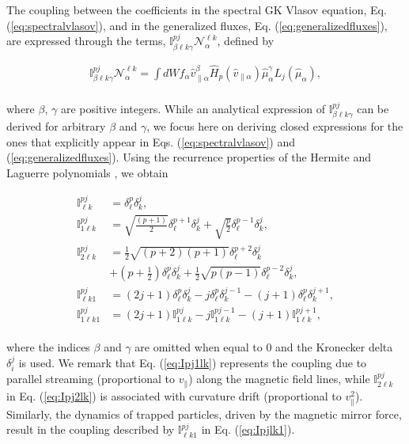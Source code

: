 \documentclass[preprint,12pt]{elsarticle}
\begin{document}
The coupling between the coefficients in the spectral GK Vlasov equation, Eq. (\ref{eq:spectralvlasov}), and in the generalized fluxes, Eq. (\ref{eq:generalizedfluxes}), are expressed through the terms, $\mathbb{I}^{ pj }_{\beta\ell k \gamma} \mathcal{N}_\alpha^{\ell k}$, defined by

\begin{align}
 \mathbb{I}^{ pj }_{\beta\ell k \gamma} \mathcal{N}_\alpha^{\ell k} = \int d W f_\alpha  \hat v_{\parallel \alpha}^\beta \hat{H}_p(\hat v_{\parallel \alpha}) \hat \mu_\alpha^\gamma  L_j(\hat \mu_\alpha),
\end{align}
\\
where $\beta$, $\gamma$ are positive integers. While an analytical expression of $\mathbb{I}^{ pj }_{\beta\ell k \gamma} $ can be derived for arbitrary $\beta$ and $\gamma$, we focus here on deriving closed expressions for the ones that explicitly appear in Eqs. (\ref{eq:spectralvlasov}) and (\ref{eq:generalizedfluxes}). Using the recurrence properties of the Hermite and Laguerre polynomials \cite{gradshteyn2014}, we obtain 

\begin{subequations} \label{eq:mixingmatrices}
  \begin{align}
    \mathbb{I}^{pj }_{\ell k}& = \delta_\ell^p \delta_{k}^j, \\
    \mathbb{I}^{pj }_{1\ell k}& = \sqrt{\frac{(p+1)}{2}} \delta_\ell^{p+1}  \delta_{k}^j+  \sqrt{\frac{p}{2}}  \delta_\ell^{p-1}  \delta_{k}^j, \label{eq:Ipj1lk}\\
      \mathbb{I}^{pj }_{2\ell k}
  &  =  \frac{1}{2}  \sqrt{(p+2)(p+1)} \delta_\ell^{p+2} \delta_{k}^j \nonumber \\& + \left( p + \frac{1}{2}\right) \delta_\ell^{p}\delta_{k}^j  + \frac{1}{2} \sqrt{p(p-1)} \delta_\ell^{p-2} \delta_{k}^j, \label{eq:Ipj2lk}\\
      \mathbb{I}^{pj }_{\ell k1}  & = (2 j+1) \delta_\ell^{p}\delta_{k}^{j} -j \delta_\ell^{p} \delta_{k}^{j-1}- (j+1)\delta_\ell^{p}\delta_{k}^{j+1}, \label{eq:Ipjlk1} \\
      \mathbb{I}^{pj }_{1\ell k1}  & = (2 j + 1)  \mathbb{I}^{pj }_{1\ell k}  -j  \mathbb{I}^{ pj-1 }_{1\ell k} - (j+1)  \mathbb{I}^{pj+1 }_{1\ell k}\label{eq:Ipjl1k1}, \end{align}
\end{subequations}
\\
where the indices $\beta$ and $\gamma$ are omitted when equal to $0$ and the Kronecker delta $\delta_i^j$ is used. We remark that Eq. (\ref{eq:Ipj1lk}) represents the coupling due to parallel streaming (proportional to $v_\parallel$) along the magnetic field lines, while $\mathbb{I}^{pj }_{2\ell k}$ in Eq. (\ref{eq:Ipj2lk}) is associated with curvature drift (proportional to $v_\parallel^2$). Similarly, the dynamics of trapped particles, driven by the magnetic mirror force, result in the coupling described by $\mathbb{I}^{pj }_{\ell k1}$ in Eq. (\ref{eq:Ipjlk1}).
\end{document}
